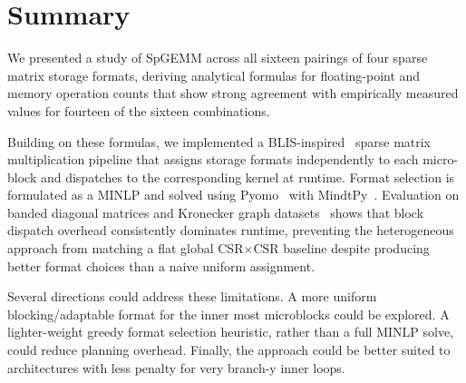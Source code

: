 \documentclass[sigconf, review, anonymous]{acmart}
\begin{document}
\section{Summary}

We presented a study of SpGEMM across all sixteen pairings of four sparse matrix
storage formats, deriving analytical formulas for floating-point and memory operation
counts that show strong agreement with empirically measured values for fourteen of the
sixteen combinations.

Building on these formulas, we implemented a BLIS-inspired~\cite{blis} sparse matrix
multiplication pipeline that assigns storage formats independently to each micro-block
and dispatches to the corresponding kernel at runtime. Format selection is formulated
as a MINLP and solved using Pyomo~\cite{pyomo} with MindtPy~\cite{mindtpy}. Evaluation
on banded diagonal matrices and Kronecker graph datasets~\cite{kronecker} shows that
block dispatch overhead consistently dominates runtime, preventing the heterogeneous
approach from matching a flat global CSR$\times$CSR baseline despite producing better
format choices than a naive uniform assignment.

Several directions could address these limitations. A more uniform blocking/adaptable
format for the inner most microblocks could be explored. A lighter-weight greedy format
selection heuristic, rather than a full MINLP solve, could reduce planning overhead.
Finally, the approach could be better suited to architectures with less penalty for very
branch-y inner loops.



\end{document}
